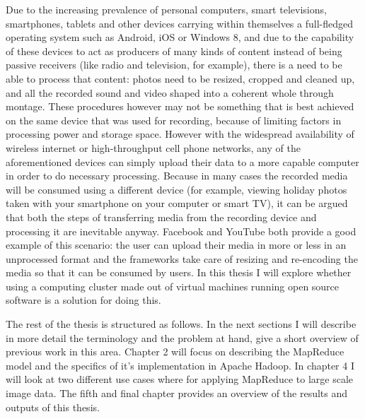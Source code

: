 \documentclass [12pt,a4paper]{report}
\begin{document}
Due to the increasing prevalence of personal computers, smart televisions, smartphones, tablets and other devices carrying within themselves a full-fledged operating system such as Android, iOS or Windows 8, and due to the capability of these devices to act as producers of many kinds of content instead of being passive receivers (like radio and television, for example), there is a need to be able to process that content: photos need to be resized, cropped and cleaned up, and all the recorded sound and video shaped into a coherent whole through montage. These procedures however may not be something that is best achieved on the same device that was used for recording, because of limiting factors in processing power and storage space. However with the widespread availability of wireless internet or high-throughput cell phone networks, any of the aforementioned devices can simply upload their data to a more capable computer in order to do necessary processing. Because in many cases the recorded media will be consumed using a different device (for example, viewing holiday photos taken with your smartphone on your computer or smart TV), it can be argued that both the steps of transferring media from the recording device and processing it are inevitable anyway. Facebook and YouTube both provide a good example of this scenario: the user can upload their media in more or less in an unprocessed format and the frameworks take care of resizing and re-encoding the media so that it can be consumed by users. In this thesis I will explore whether using a computing cluster made out of virtual machines running open source software is a solution for doing this.

The rest of the thesis is structured as follows. In the next sections I will describe in more detail the terminology and the problem at hand, give a short overview of previous work in this area. Chapter 2 will focus on describing the MapReduce model and the specifics of it's implementation in Apache Hadoop. In chapter 4 I will look at two different use cases where for applying MapReduce to large scale image data. The fifth and final chapter provides an overview of the results and outputs of this thesis. %


\end{document}
